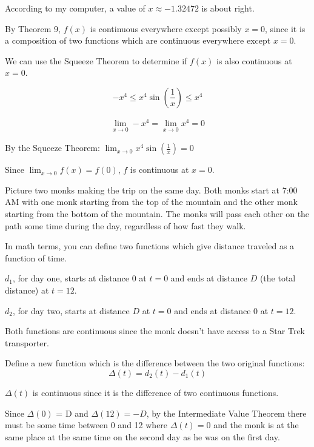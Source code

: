 \documentclass[letterpaper, landscape]{exam}
\begin{document}
\begin{description}
        According to my computer, a value of $x \approx -1.32472$ is about right.

      \item[63]
        By Theorem 9, $f(x)$ is continuous everywhere except possibly $x = 0$, since it is
        a composition of two functions which are continuous everywhere except $x = 0$.

        We can use the Squeeze Theorem to determine if $f(x)$ is also continuous at
        $x = 0$.

        \[
          -x^4 \leq x^4 \sin \left( \frac{1}{x} \right) \leq x^4
        \]

        \begin{align*}
          \lim_{x \to 0} -x^4 = \lim_{x \to 0} x^4 = 0
        \end{align*}

        By the Squeeze Theorem: $\lim_{x \to 0} x^4 \sin \left( \frac{1}{x} \right) = 0$

        Since $\lim_{x \to 0} f(x) = f(0)$, $f$ is continuous at $x = 0$.

      \newpage

      \item[65]
        Picture two monks making the trip on the same day. Both monks start at 7:00 AM
        with one monk starting from the top of the mountain and the other monk starting
        from the bottom of the mountain. The monks will pass each other on the path some
        time during the day, regardless of how fast they walk.

        In math terms, you can define two functions which give distance traveled as a
        function of time. 
        
        \begin{itemize*}
          \item $d_1$, for day one, starts at distance 0 at $t = 0$ and ends at distance
            $D$ (the total distance) at $t = 12$. 

          \item $d_2$, for day two, starts at distance $D$ at $t = 0$ and ends at distance
            0 at $t = 12$.
        \end{itemize*}

        Both functions are continuous since the monk doesn't have access to a Star Trek
        transporter.

        Define a new function which is the difference between the two original functions:
        \[
          \Delta(t) = d_2(t) - d_1(t)
        \]

        $\Delta(t)$ is continuous since it is the difference of two continuous functions.
        
        Since $\Delta(0)$ = D and $\Delta(12) = -D$, by the Intermediate Value Theorem
        there must be some time between 0 and 12 where $\Delta(t) = 0$ and the monk is at
        the same place at the same time on the second day as he was on the first day.

    \end{description}
\end{document}
